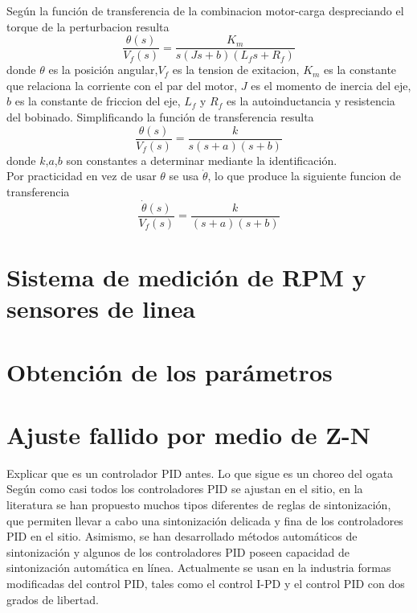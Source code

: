 \documentclass[10pt,conference,a4paper,onecolumn]{article}%
\begin{document}
 Según \cite{dorf} la función de transferencia de la combinacion motor-carga despreciando el torque de la perturbacion resulta
 \begin{equation}
 \frac{\theta(s)}{V_f(s)}=\frac{K_m}{s(Js+b)(L_fs+R_f)}
 \end{equation}
 donde $\theta$ es la posición angular,$V_f$ es la tension de exitacion, $K_m$ es la constante que relaciona la corriente con el par del motor, $J$ es el momento de inercia del eje, $b$ es la constante de friccion del eje, $L_f$  y $R_f$ es la autoinductancia y resistencia del bobinado. Simplificando la función de transferencia resulta
 \begin{equation}
 \frac{\theta(s)}{V_f(s)}=\frac{k}{s(s+a)(s+b)}
 \end{equation}
 donde $k$,$a$,$b$ son constantes a determinar mediante la identificación.\\
 Por practicidad en vez de usar $\theta$ se usa $\dot{\theta}$, lo que produce la siguiente funcion de transferencia
 \begin{equation}
 \frac{\dot{\theta}(s)}{V_f(s)}=\frac{k}{(s+a)(s+b)}
 \end{equation}
  
\section{Sistema de medición de RPM y sensores de linea}

\section{Obtención de los parámetros}

\section{Ajuste fallido por medio de Z-N}
Explicar que es un controlador PID antes. Lo que sigue es un choreo del ogata\\

Según \cite{ogata} como casi todos los controladores PID se ajustan en el sitio, en la literatura se han propuesto muchos tipos diferentes de reglas de sintonización, que permiten llevar a cabo una sintonización delicada y fina de los controladores PID en el sitio. Asimismo, se han desarrollado métodos automáticos de sintonización y algunos de los controladores PID poseen capacidad de sintonización automática en línea. Actualmente se usan en la industria formas modificadas del control PID, tales como el control I-PD y el control PID con dos grados de libertad.
\end{document}

